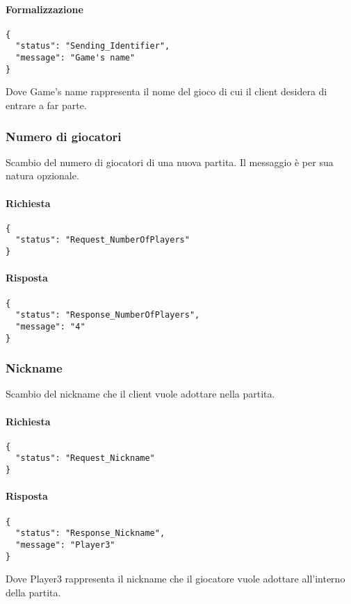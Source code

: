 \documentclass[a4paper,11pt]{article} %
\begin{document}
    \paragraph{Formalizzazione}
    \begin{verbatim}
{
  "status": "Sending_Identifier",
  "message": "Game's name"
}
    \end{verbatim}
    Dove \textsf{Game's name} rappresenta il nome del gioco di cui il client desidera di entrare a far parte.

    \subsubsection{Numero di giocatori}
    Scambio del numero di giocatori di una nuova partita.
    Il messaggio è per sua natura opzionale.

    \paragraph{Richiesta}
    \begin{verbatim}
{
  "status": "Request_NumberOfPlayers"
}
    \end{verbatim}

    \paragraph{Risposta}
    \begin{verbatim}
{
  "status": "Response_NumberOfPlayers",
  "message": "4"
}
    \end{verbatim}

    \newpage

    \subsubsection{Nickname}
    Scambio del nickname che il client vuole adottare nella partita.

    \paragraph{Richiesta}
    \begin{verbatim}
{
  "status": "Request_Nickname"
}
    \end{verbatim}

    \paragraph{Risposta}
    \begin{verbatim}
{
  "status": "Response_Nickname",
  "message": "Player3"
}
    \end{verbatim}
    Dove \textsf{Player3} rappresenta il nickname che il giocatore vuole adottare all'interno della partita.
\end{document}
